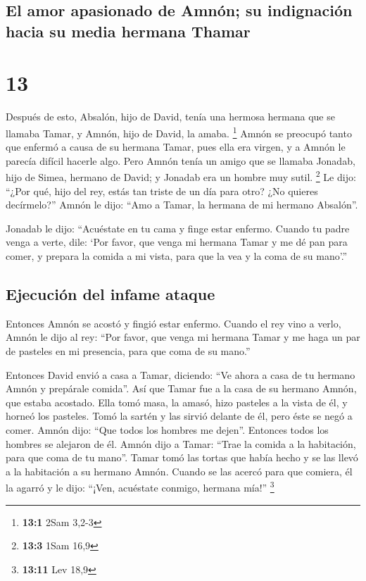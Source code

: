 \hypertarget{el-amor-apasionado-de-amnuxf3n-su-indignaciuxf3n-hacia-su-media-hermana-thamar}{%
\subsection{El amor apasionado de Amnón; su indignación hacia su media
hermana
Thamar}\label{el-amor-apasionado-de-amnuxf3n-su-indignaciuxf3n-hacia-su-media-hermana-thamar}}

\hypertarget{section-12}{%
\section{13}\label{section-12}}

 Después de esto, Absalón, hijo de David, tenía una
hermosa hermana que se llamaba Tamar, y Amnón, hijo de David, la amaba.
\footnote{\textbf{13:1} 2Sam 3,2-3}  Amnón se preocupó
tanto que enfermó a causa de su hermana Tamar, pues ella era virgen, y a
Amnón le parecía difícil hacerle algo.  Pero Amnón tenía
un amigo que se llamaba Jonadab, hijo de Simea, hermano de David; y
Jonadab era un hombre muy sutil. \footnote{\textbf{13:3} 1Sam 16,9}
 Le dijo: ``¿Por qué, hijo del rey, estás tan triste de un
día para otro? ¿No quieres decírmelo?'' Amnón le dijo: ``Amo a Tamar, la
hermana de mi hermano Absalón''.

 Jonadab le dijo: ``Acuéstate en tu cama y finge estar
enfermo. Cuando tu padre venga a verte, dile: `Por favor, que venga mi
hermana Tamar y me dé pan para comer, y prepara la comida a mi vista,
para que la vea y la coma de su mano'.''

\hypertarget{ejecuciuxf3n-del-infame-ataque}{%
\subsection{Ejecución del infame
ataque}\label{ejecuciuxf3n-del-infame-ataque}}

 Entonces Amnón se acostó y fingió estar enfermo. Cuando
el rey vino a verlo, Amnón le dijo al rey: ``Por favor, que venga mi
hermana Tamar y me haga un par de pasteles en mi presencia, para que
coma de su mano.''

 Entonces David envió a casa a Tamar, diciendo: ``Ve ahora
a casa de tu hermano Amnón y prepárale comida''.  Así que
Tamar fue a la casa de su hermano Amnón, que estaba acostado. Ella tomó
masa, la amasó, hizo pasteles a la vista de él, y horneó los pasteles.
 Tomó la sartén y las sirvió delante de él, pero éste se
negó a comer. Amnón dijo: ``Que todos los hombres me dejen''. Entonces
todos los hombres se alejaron de él.  Amnón dijo a Tamar:
``Trae la comida a la habitación, para que coma de tu mano''. Tamar tomó
las tortas que había hecho y se las llevó a la habitación a su hermano
Amnón.  Cuando se las acercó para que comiera, él la
agarró y le dijo: ``¡Ven, acuéstate conmigo, hermana mía!'' \footnote{\textbf{13:11}
  Lev 18,9}

